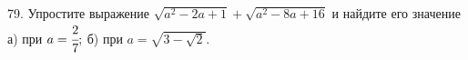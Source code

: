 79. Упростите выражение $\sqrt{a^2-2a+1}+\sqrt{a^2-8a+16}$ и найдите его значение\\
а) при $a=\cfrac{2}{7};$ б) при $a=\sqrt{3-\sqrt{2}}.$\\
